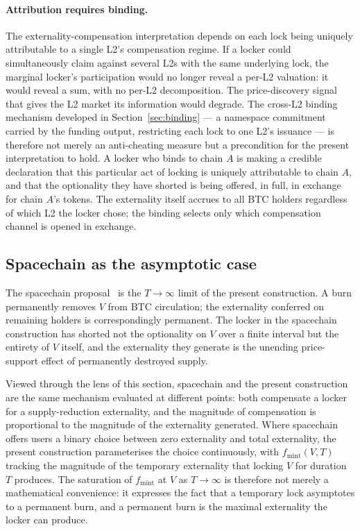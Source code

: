 \documentclass[11pt,a4paper]{article}
\newcommand{\fmint}{f_{\mathrm{mint}}}
\begin{document}
\paragraph{Attribution requires binding.} The externality-compensation interpretation depends on each lock being uniquely attributable to a single L2's compensation regime. If a locker could simultaneously claim against several L2s with the same underlying lock, the marginal locker's participation would no longer reveal a per-L2 valuation: it would reveal a sum, with no per-L2 decomposition. The price-discovery signal that gives the L2 market its information would degrade. The cross-L2 binding mechanism developed in Section~\ref{sec:binding} --- a namespace commitment carried by the funding output, restricting each lock to one L2's issuance --- is therefore not merely an anti-cheating measure but a precondition for the present interpretation to hold. A locker who binds to chain $A$ is making a credible declaration that this particular act of locking is uniquely attributable to chain $A$, and that the optionality they have shorted is being offered, in full, in exchange for chain $A$'s tokens. The externality itself accrues to all BTC holders regardless of which L2 the locker chose; the binding selects only which compensation channel is opened in exchange.

\subsection{Spacechain as the asymptotic case}

The spacechain proposal~\cite{spacechain} is the $T \to \infty$ limit of the present construction. A burn permanently removes $V$ from BTC circulation; the externality conferred on remaining holders is correspondingly permanent. The locker in the spacechain construction has shorted not the optionality on $V$ over a finite interval but the entirety of $V$ itself, and the externality they generate is the unending price-support effect of permanently destroyed supply.

Viewed through the lens of this section, spacechain and the present construction are the same mechanism evaluated at different points: both compensate a locker for a supply-reduction externality, and the magnitude of compensation is proportional to the magnitude of the externality generated. Where spacechain offers users a binary choice between zero externality and total externality, the present construction parameterises the choice continuously, with $\fmint(V, T)$ tracking the magnitude of the temporary externality that locking $V$ for duration $T$ produces. The saturation of $\fmint$ at $V$ as $T \to \infty$ is therefore not merely a mathematical convenience: it expresses the fact that a temporary lock asymptotes to a permanent burn, and a permanent burn is the maximal externality the locker can produce.
\end{document}
